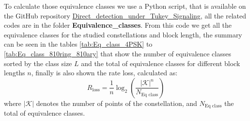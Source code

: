 To calculate those equivalence classes we use a Python script, that is available on the GitHub repository \href{https://github.com/dfigueroa11/Direct_detection_under_Tukey_Signaling.git}{Direct\_detection\_under\_Tukey\_Signaling}, all the related codes are in the folder \textbf{Equivalence\_classes}. From this code we get all the equivalence classes for the studied constellations and block length, the summary can be seen in the tables \ref{tab:Eq_class_4PSK} to \ref{tab:Eq_class_810ring_810ary} that show the number of equivalence classes sorted by the class size $L$ and the total of equivalence classes for different block lengths $n$, finally is also shown the rate loss, calculated as:
\begin{equation}
R_\text{loss}=\frac{1}{n}\log_2\left(\frac{|\mathcal K|^n}{N_\text{Eq class}}\right)
\label{eq:rate_loss}
\end{equation}
where $|\mathcal K|$ denotes the number of points of the constellation, and $N_\text{Eq class}$ the total of equivalence classes.\\


